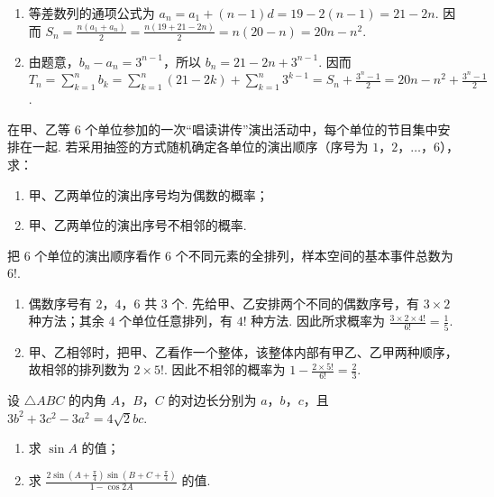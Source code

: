 \begin{solution}
\begin{enumerate}
\item 等差数列的通项公式为 \(a_n=a_1+(n-1)d=19-2(n-1)=21-2n\). 因而 \(S_n=\frac{n(a_1+a_n)}{2}=\frac{n(19+21-2n)}{2}=n(20-n)=20n-n^2\).
\item 由题意，\(b_n-a_n=3^{n-1}\)，所以 \(b_n=21-2n+3^{n-1}\). 因而 \(T_n=\sum_{k=1}^{n}b_k=\sum_{k=1}^{n}(21-2k)+\sum_{k=1}^{n}3^{k-1}=S_n+\frac{3^n-1}{2}=20n-n^2+\frac{3^n-1}{2}\).
\end{enumerate}
\end{solution}

\begin{problem}
在甲、乙等 6 个单位参加的一次“唱读讲传”演出活动中，每个单位的节目集中安排在一起. 若采用抽签的方式随机确定各单位的演出顺序（序号为 \(1\)，\(2\)，\(\ldots\)，\(6\)），求：
\begin{enumerate}
\item 甲、乙两单位的演出序号均为偶数的概率；
\item 甲、乙两单位的演出序号不相邻的概率.
\end{enumerate}
\end{problem}

\begin{solution}
把 6 个单位的演出顺序看作 6 个不同元素的全排列，样本空间的基本事件总数为 \(6!\).
\begin{enumerate}
\item 偶数序号有 \(2\)，\(4\)，\(6\) 共 \(3\) 个. 先给甲、乙安排两个不同的偶数序号，有 \(3\times2\) 种方法；其余 4 个单位任意排列，有 \(4!\) 种方法. 因此所求概率为 \(\frac{3\times2\times4!}{6!}=\frac{1}{5}\).
\item 甲、乙相邻时，把甲、乙看作一个整体，该整体内部有甲乙、乙甲两种顺序，故相邻的排列数为 \(2\times5!\). 因此不相邻的概率为 \(1-\frac{2\times5!}{6!}=\frac{2}{3}\).
\end{enumerate}
\end{solution}

\begin{problem}
设 \(\triangle ABC\) 的内角 \(A\)，\(B\)，\(C\) 的对边长分别为 \(a\)，\(b\)，\(c\)，且 \(3b^{2} + 3c^{2} - 3a^{2} = 4\sqrt{2}bc\).
\begin{enumerate}
\item 求 \(\sin A\) 的值；
\item 求 \(\frac{2\sin\left(A + \frac{\pi}{4}\right)\sin\left(B + C + \frac{\pi}{4}\right)}{1 - \cos 2A}\) 的值.
\end{enumerate}
\end{problem}


